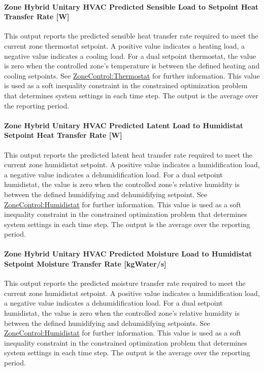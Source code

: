 \paragraph{Zone Hybrid Unitary HVAC Predicted Sensible Load to Setpoint Heat Transfer Rate [W]}
This output reports the predicted sensible heat transfer rate required to meet the current zone thermostat setpoint. A positive value indicates a heating load, a negative value indicates a cooling load. For a dual setpoint thermostat, the value is zero when the controlled zone’s temperature is between the defined heating and cooling setpoints. See \hyperref[zonecontrolthermostat]{ZoneControl:Thermostat} for further information. This value is used as a soft inequality constraint in the constrained optimization problem that determines system settings in each time step. The output is the average over the reporting period.

\paragraph{Zone Hybrid Unitary HVAC Predicted Latent Load to Humidistat Setpoint Heat Transfer Rate [W]}
This output reports the predicted latent heat transfer rate required to meet the current zone humidistat setpoint. A positive value indicates a humidification load, a negative value indicates a dehumidification load. For a dual setpoint humidistat, the value is zero when the controlled zone’s relative humidity is between the defined humidifying and dehumidifying setpoint. See \hyperref[zonecontrolhumidistat]{ZoneControl:Humidistat} for further information. This value is used as a soft inequality constraint in the constrained optimization problem that determines system settings in each time step. The output is the average over the reporting period.

\paragraph{Zone Hybrid Unitary HVAC Predicted Moisture Load to Humidistat Setpoint Moisture Transfer Rate [kgWater/s]}
This output reports the predicted moisture transfer rate required to meet the current zone humidistat setpoint. A positive value indicates a humidification load, a negative value indicates a dehumidification load. For a dual setpoint humidistat, the value is zero when the controlled zone’s relative humidity is between the defined humidifying and dehumidifying setpoints. See \hyperref[zonecontrolhumidistat]{ZoneControl:Humidistat} for further information. This value is used as a soft inequality constraint in the constrained optimization problem that determines system settings in each time step. The output is the average over the reporting period.

